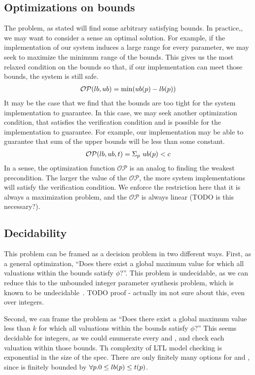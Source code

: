 \subsection{Optimizations on bounds}
The problem, as stated will find some arbitrary satisfying bounds.
In practice,, we may want to consider a sense an optimal solution.
For example, if the implementation of our system induces a large range for every parameter, we may seek to maximize the minimum range of the bounds. 
This gives us the most relaxed condition on the bounds so that, if our implementation can meet those bounds, the system is still safe.
%
\begin{align*}
	\mathcal{OP}(lb,ub) = \text{min}(ub(p) - lb(p)) 
\end{align*}
%
It may be the case that we find that the bounds are too tight for the system implementation to guarantee. 
In this case, we may seek another optimization condition, that satisfies the verification condition and is possible for the implementation to guarantee.
For example, our implementation may be able to guarantee that sum of the upper bounds will be less than some constant.
\begin{align*}
\mathcal{OP}(lb,ub,t) = \Sigma_{p} \ ub(p) < c
\end{align*}
%
In a sense, the optimization function $\mathcal{OP}$ is an analog to finding the weakest precondition.
The larger the value of the $\mathcal{OP}$, the more system implementations will satisfy the verification condition.
We enforce the restriction here that it is always a maximization problem, and the $\mathcal{OP}$ is always linear (TODO is this necessary?).

\subsection{Decidability}

This problem can be framed as a decision problem in two different ways.
First, as a general optimization, ``Does there exist a global maximum value for which all valuations within the bounds satisfy $\phi$?''.
This problem is undecidable, as we can reduce this to the unbounded integer parameter synthesis problem, which is known to be undecidable~\cite{benevs2015language}.
TODO proof - actually im not sure about this, even over integers.

Second, we can frame the problem as ``Does there exist a global maximum value less than $k$ for which all valuations within the bounds satisfy $\phi$?''
This seems decidable for integers, as we could enumerate every \lowerB and \upperB, and check each valuation within those bounds.
Th complexity of LTL model checking is exponential in the size of the spec.
There are only finitely many options for \lowerB and \upperB, since \lowerB is finitely bounded by $\forall p. 0 \leq lb(p) \leq t(p)$.




